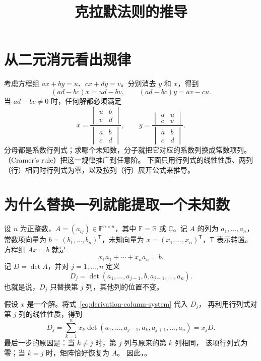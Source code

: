 \documentclass[UTF8,12pt,a4paper,fontset=fandol]{ctexart}
\title{克拉默法则的推导}
\author{}
\date{}
\begin{document}
\maketitle

\section{从二元消元看出规律}

考虑方程组 $ax+by=u$、$cx+dy=v$。分别消去 $y$ 和 $x$，得到
\[
  (ad-bc)x=ud-bv,\qquad (ad-bc)y=av-cu.
\]
当 $ad-bc\ne0$ 时，任何解都必须满足
\[
  x=\frac{\begin{vmatrix}u&b\\v&d\end{vmatrix}}
          {\begin{vmatrix}a&b\\c&d\end{vmatrix}},\qquad
  y=\frac{\begin{vmatrix}a&u\\c&v\end{vmatrix}}
          {\begin{vmatrix}a&b\\c&d\end{vmatrix}}.
\]
分母都是系数行列式；求哪个未知数，分子就把它对应的系数列换成常数项列。
（Cramer's rule）把这一规律推广到任意阶。
下面只用行列式的线性性质、两列（行）相同时行列式为零，以及按列（行）展开公式来推导。

\section{为什么替换一列就能提取一个未知数}

设 $n$ 为正整数，$A=(a_{ij})\in\mathbb F^{n\times n}$，其中
$\mathbb F=\mathbb R$ 或 $\mathbb C$。记 $A$ 的列为 $a_1,\ldots,a_n$，
常数项向量为 $b=(b_1,\ldots,b_n)^{\mathsf T}$，未知向量为
$x=(x_1,\ldots,x_n)^{\mathsf T}$，$\mathsf T$ 表示转置。
方程组 $Ax=b$ 就是
\begin{equation}
  x_1a_1+\cdots+x_na_n=b.
  \label{eq:derivation-column-system}
\end{equation}
记 $D=\det A$，并对 $j=1,\ldots,n$ 定义
\[
  D_j=\det(a_1,\ldots,a_{j-1},b,a_{j+1},\ldots,a_n).
\]
也就是说，$D_j$ 只替换第 $j$ 列，其他列的位置不变。

假设 $x$ 是一个解。将式~\eqref{eq:derivation-column-system} 代入 $D_j$，
再利用行列式对第 $j$ 列的线性性质，得到
\begin{equation}
  D_j=\sum_{k=1}^n x_k
  \det(a_1,\ldots,a_{j-1},a_k,a_{j+1},\ldots,a_n)=x_jD.
  \label{eq:derivation-extract}
\end{equation}
最后一步的原因是：当 $k\ne j$ 时，第 $j$ 列与原来的第 $k$ 列相同，
该项行列式为零；当 $k=j$ 时，矩阵恰好恢复为 $A$。
因此，。
\end{document}
